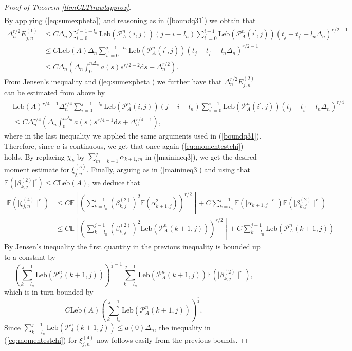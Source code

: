\documentclass{article}
\theoremstyle{plain}
\theoremstyle{definition}
\theoremstyle{remark}
\begin{document}
\begin{appendix}
\begin{proof}[Proof of Theorem  \ref{thmCLTtrawlapprox}]
\begin{align*}
	\end{align*}
	By applying (\ref{eq:sumexpbeta}) and reasoning as in (\ref{boundq31})
	we obtain that 
	\begin{align*}
		\Delta_n^{r/2}E^{(1)}_{j,n} &\leq C \Delta_{n}\sum_{i=0}^{j-1-l_n}\mathrm{Leb}(\mathcal{P}_{A}^{n}(i,j))(j-i-l_n)\sum_{i^{\prime}=0}^{i-1}\mathrm{Leb}(\mathcal{P}_{A}^{n}(i^{\prime},j))(t_{j}-t_{i^{\prime}}-l_n\Delta_n)^{r/2-1}\\
		& \leq C\mathrm{Leb}(A)\Delta_{n}\sum_{i^{\prime}=0}^{j-1-l_n}\mathrm{Leb}(\mathcal{P}_{A}^{n}(i^{\prime},j))(t_{j}-t_{i^{\prime}}-l_n\Delta_n)^{r/2-1}\\
		& \leq C\Delta_{n}\left(\Delta_{n}\int_{0}^{n\Delta_{n}}a(s)s^{r/2-2}\mathrm{d}s+\Delta_{n}^{r/2}\right).
	\end{align*}
	From Jensen's inequality and  (\ref{eq:sumexpbeta}) we further have that $\Delta_n^{r/2}E^{(2)}_{j,n}$ can be  estimated from above by
	\begin{align*}
		 & \mathrm{Leb}(A)^{r/4-1}\Delta_{n}^{r/4}\sum_{i=0}^{j-1-l_n}\mathrm{Leb}(\mathcal{P}_{A}^{n}(i,j))(j-i-l_n)\sum_{i^{\prime}=0}^{i-1}\mathrm{Leb}(\mathcal{P}_{A}^{n}(i^{\prime},j))(t_{j}-t_{i^{\prime}}-l_n\Delta_n)^{r/4}\\
		& \leq C\Delta_{n}^{r/4}\left(\Delta_{n}\int_{0}^{n\Delta_{n}}a(s)s^{r/4-1}\mathrm{d}s+\Delta_{n}^{r/4+1}\right),
	\end{align*}
	where in the last inequality we applied the same arguments used in  (\ref{boundq31}).  Therefore, since $a$ is continuous, we get that once again (\ref{eq:momentestchi})
	holds. By replacing $\chi_{k}$ by $\sum_{m=k+1}^{j}\alpha_{k+1,m}$
	in (\ref{mainineq3}), we get the desired moment estimate for $\xi_{j,n}^{(5)}$.
	Finally, arguing as in (\ref{mainineq3}) and using that  $\mathbb{E}(\rvert\beta_{k,j}^{(2)}\rvert^{r})\leq C\mathrm{Leb}(A)$, we deduce that 
	\[
	\begin{aligned}\mathbb{E}(\mid\xi_{j,n}^{(4)}\mid^{r}) & \leq C\mathbb{E}\left[\left(\sum_{k=l_n}^{j-1}(\beta_{k,j}^{(2)})^{2}\mathbb{E}(\alpha_{k+1,j}^{2})\right)^{r/2}\right]+C\sum_{k=l_n}^{j-1}\mathbb{E}(\mid\alpha_{k+1,j}\mid^{r})\mathbb{E}(\mid\beta_{k,j}^{(2)}\mid^{r})\\
		& \leq C\mathbb{E}\left[\left(\sum_{k=l_n}^{j-1}(\beta_{k,j}^{(2)})^{2}\mathrm{Leb}(\mathcal{P}_{A}^{n}(k+1,j))\right)^{r/2}\right]+C\sum_{k=l_n}^{j-1}\mathrm{Leb}(\mathcal{P}_{A}^{n}(k+1,j))
	\end{aligned}
	\]
	By Jensen's inequality the first quantity in the previous inequality is bounded up to a constant by  
\[\left(\sum_{k=l_n}^{j-1}\mathrm{Leb}(\mathcal{P}_{A}^{n}(k+1,j))\right)^{\frac{r}{2}-1}\sum_{k=l_n}^{j-1}\mathrm{Leb}(\mathcal{P}_{A}^{n}(k+1,j))\mathbb{E}(\mid\beta_{k,j}^{(2)}\mid^{r}),\]
	which is in turn bounded by 
\[C\mathrm{Leb}(A)\left(\sum_{k=l_n}^{j-1}\mathrm{Leb}(\mathcal{P}_{A}^{n}(k+1,j))\right)^{\frac{r}{2}}.\]
 Since $\sum_{k=l_{n}}^{j-1} \mathrm{Leb}(\mathcal{P}_{A}^{n}(k+1,j))\leq a(0)\Delta_{n}$, the inequality in (\ref{eq:momentestchi})  for $\xi_{j,n}^{(4)}$  now follows easily from the previous bounds.
 \end{proof}



\end{appendix}
\end{document}
